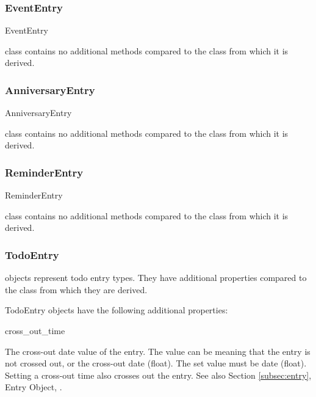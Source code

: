 \subsubsection{EventEntry}
\label{subsubsec:evententry}

\begin{classdesc*}{EventEntry}
\end{classdesc*}

 class contains no additional methods compared to the 
 class from which it is derived.

\subsubsection{AnniversaryEntry}
\label{subsubsec:anniversaryentry}

\begin{classdesc*}{AnniversaryEntry}
\end{classdesc*}

 class contains no additional methods compared to 
the  class from which it is derived.

\subsubsection{ReminderEntry}
\label{subsubsec:reminderentry}

\begin{classdesc*}{ReminderEntry}
\end{classdesc*}

 class contains no additional methods compared to 
the  class from which it is derived.

\subsubsection{TodoEntry}
\label{subsubsec:todoentry}

objects represent todo entry types. They have additional 
properties compared to the  class from which they are derived.

\begin{classdesc*}{TodoEntry}
objects have the following additional properties:

\begin{memberdesc}[TodoEntry]{cross_out_time}

The cross-out date value of the entry. The value can be  meaning that 
the entry is not crossed out, or the cross-out date (float). The set value must 
be date (float). Setting a cross-out time also crosses out the entry. See also 
Section \ref{subsec:entry}, Entry Object, .

\end{memberdesc}

\end{classdesc*}


